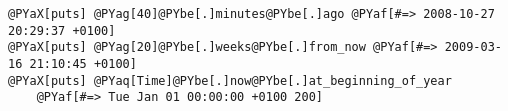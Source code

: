 \begin{Verbatim}[commandchars=@\[\]]
@PYaX[puts] @PYag[40]@PYbe[.]minutes@PYbe[.]ago @PYaf[#=> 2008-10-27 20:29:37 +0100]
@PYaX[puts] @PYag[20]@PYbe[.]weeks@PYbe[.]from_now @PYaf[#=> 2009-03-16 21:10:45 +0100]
@PYaX[puts] @PYaq[Time]@PYbe[.]now@PYbe[.]at_beginning_of_year
	@PYaf[#=> Tue Jan 01 00:00:00 +0100 200]
\end{Verbatim}
